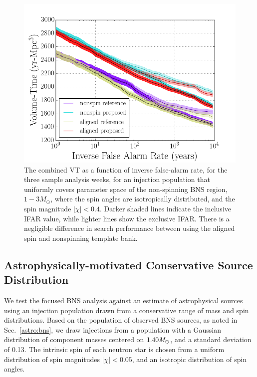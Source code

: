 \begin{figure}
\centering
\includegraphics[width=1.0\textwidth]{papers/bns_o1_dev/figures/prec_combined.png}
\caption{\label{fig:prec} 
The combined VT as a function of inverse false-alarm rate, for the
three sample analysis weeks, for an injection population that uniformly covers parameter space of the non-spinning BNS region, $1- 3M_\odot$, where
the spin angles are isotropically distributed, and the spin magnitude $|\chi| < 0.4$. Darker shaded lines indicate the inclusive IFAR value, while lighter lines show the exclusive IFAR. There is a negligible difference in search performance between using the aligned spin and nonspinning template bank.
}
\end{figure}

\subsection{Astrophysically-motivated Conservative Source Distribution}

We test the focused BNS analysis against an estimate of astrophysical sources using an injection population drawn from a conservative range of mass and spin distributions. Based on the population of observed BNS sources, as noted in Sec.~\ref{astro:bns}, we draw injections from a population with a Gaussian distribution of component masses centered on $1.40 \mathit{M}_\odot$, and a standard deviation of 0.13. The intrinsic spin of each neutron star is chosen from a uniform distribution of spin magnitudes $|\chi| < 0.05$, and an isotropic distribution of spin angles. 

